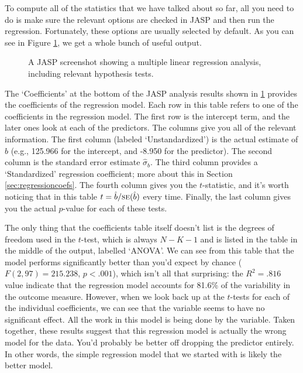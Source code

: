 
To compute all of the statistics that we have talked about so far, all you need to do is make sure the relevant options are checked in JASP and then run the regression. Fortunately, these options are usually selected by default. As you can see in Figure \ref{fig:reg2}, we get a whole bunch of useful output.

\begin{figure}[!htb]
\begin{center}
\caption{A JASP screenshot showing a multiple linear regression analysis, including relevant hypothesis tests.}
\HR
\label{fig:reg2}
\end{center}
\end{figure}

The `Coefficients' at the bottom of the JASP analysis results shown in \ref{fig:reg2} provides the coefficients of the regression model. Each row in this table refers to one of the coefficients in the regression model. The first row is the intercept term, and the later ones look at each of the predictors. The columns give you all of the relevant information. The first column (labeled `Unstandardized') is the actual estimate of $b$ (e.g., 125.966 for the intercept, and -8.950 for the  predictor). The second column is the standard error estimate $\hat\sigma_b$. The third column provides a `Standardized' regression coefficient; more about this in Section \ref{sec:regressioncoefs}. The fourth column gives you the $t$-statistic, and it's worth noticing that in this table $t= \hat{b}/ \mbox{\textsc{se}}(\hat{b})$ every time. Finally, the last column gives you the actual $p$-value for each of these tests. 

The only thing that the coefficients table itself doesn't list is the degrees of freedom used in the $t$-test, which is always $N-K-1$ and is listed in the table in the middle of the output, labelled `ANOVA'. We can see from this table that the model performs significantly better than you'd expect by chance ($F(2,97) = 215.238$, $p<.001$), which isn't all that surprising: the $R^2 = .816$ value indicate that the regression model accounts for 81.6\% of the variability in the outcome measure. However, when we look back up at the $t$-tests for each of the individual coefficients, we can see that the  variable seems to have no significant effect. All the work in this model is being done by the  variable. Taken together, these results suggest that this regression model is actually the wrong model for the data. You'd probably be better off dropping the  predictor entirely. In other words, the simple regression model that we started with is likely the better model.


